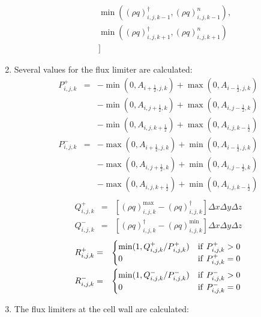 \begin{enumerate}
\begin{eqnarray}
&&\min( \left(\rho q\right)^{\dagger}_{i,j,k-1},\left(\rho q\right)^{n}_{i,j,k-1} ),\nonumber\\
&&\min( \left(\rho q\right)^{\dagger}_{i,j,k+1},\left(\rho q\right)^{n}_{i,j,k+1} ) \nonumber\\
&&]
\end{eqnarray}
\item Several values for the flux limiter are calculated:
\begin{eqnarray}
P_{i,j,k}^{+} &=& 
-\min ( 0, A_{i+\frac{1}{2},j,k} ) + \max( 0, A_{i-\frac{1}{2},j,k} )\nonumber\\
&&
-\min ( 0, A_{i,j+\frac{1}{2},k} ) + \max( 0, A_{i,j-\frac{1}{2},k} )\nonumber\\
&&
-\min ( 0, A_{i,j,k+\frac{1}{2}} ) + \max( 0, A_{i,j,k-\frac{1}{2}} )\\
P_{i,j,k}^{-} &=& 
-\max ( 0, A_{i+\frac{1}{2},j,k} ) + \min( 0, A_{i-\frac{1}{2},j,k} )\nonumber\\
&&
-\max ( 0, A_{i,j+\frac{1}{2},k} ) + \min( 0, A_{i,j-\frac{1}{2},k} )\nonumber\\
&&
-\max ( 0, A_{i,j,k+\frac{1}{2}} ) + \min( 0, A_{i,j,k-\frac{1}{2}} )\\
\end{eqnarray}
\begin{eqnarray}
Q_{i,j,k}^{+} &=& 
\left[\left(\rho q\right)^{\max}_{i,j,k} - \left(\rho q\right)^{\dagger}_{i,j,k} \right]
\Delta x \Delta y \Delta z\\
Q_{i,j,k}^{-} &=& 
\left[\left(\rho q\right)^{\dagger}_{i,j,k}-\left(\rho q\right)^{\min}_{i,j,k} \right]
\Delta x \Delta y \Delta z
\end{eqnarray}
\begin{eqnarray}
R_{i,j,k}^{+} &=& 
\begin{cases}
        \min( 1, Q_{i,j,k}^{+}/P_{i,j,k}^{+} ) & {\rm if~} P_{i,j,k}^{+}>0\\
        0 & {\rm if~} P_{i,j,k}^{+}=0\\
\end{cases}
\\
R_{i,j,k}^{-} &=& 
\begin{cases}
        \min( 1, Q_{i,j,k}^{-}/P_{i,j,k}^{-} ) & {\rm if~} P_{i,j,k}^{-}>0\\
        0 & {\rm if~} P_{i,j,k}^{-}=0\\
\end{cases}
\end{eqnarray}
\item The flux limiters at the cell wall are calculated:

\end{enumerate}
